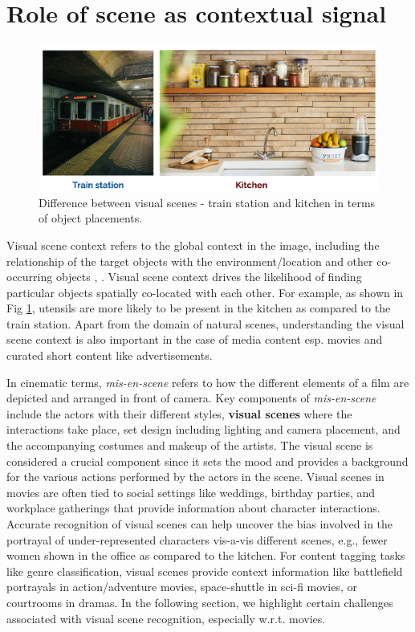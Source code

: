 \section{Role of scene as contextual signal}
\begin{figure}[h!]
    \centering 
     \includegraphics[width=0.6\linewidth]{figures/train_station_kitchen.png}
     \caption{Difference between visual scenes - train station and kitchen in terms of object placements.}
     \label{station_kitchen}
\end{figure}
Visual scene context refers to the global context in the image, including the relationship of the target objects with the environment/location and other co-occurring objects \cite{Bar2004VisualOI}, \cite{Qiao2021ObjectLevelSC}. Visual scene context drives the likelihood of finding particular objects spatially co-located with each other. For example, as shown in Fig \ref{station_kitchen}, utensils are more likely to be present in the kitchen as compared to the train station. 
Apart from the domain of natural scenes, understanding the visual scene context is also important in the case of media content \cite{CMI} esp. movies and curated short content like advertisements. 
\par
In cinematic terms, \textit{mis-en-scene} \cite{Bordwell1979FilmAA} refers to how the different elements of a film are depicted and arranged in front of camera. Key components of \textit{mis-en-scene} include the actors with their different styles, \textbf{visual scenes} where the interactions take place, set design including lighting and camera placement, and the accompanying costumes and makeup of the artists. The visual scene is considered a crucial component since it sets the mood and provides a background for the various actions performed by the actors in the scene. Visual scenes in movies are often tied to social settings like weddings, birthday parties, and workplace gatherings that provide information about character interactions. Accurate recognition of visual scenes can help uncover the bias involved in the portrayal of under-represented characters vis-a-vis different scenes, e.g., fewer women shown in the office as compared to the kitchen. For content tagging tasks like genre classification, visual scenes provide context information like battlefield portrayals in action/adventure movies, space-shuttle in sci-fi movies, or courtrooms in dramas.
In the following section, we highlight certain challenges associated with visual scene recognition, especially w.r.t. movies.
